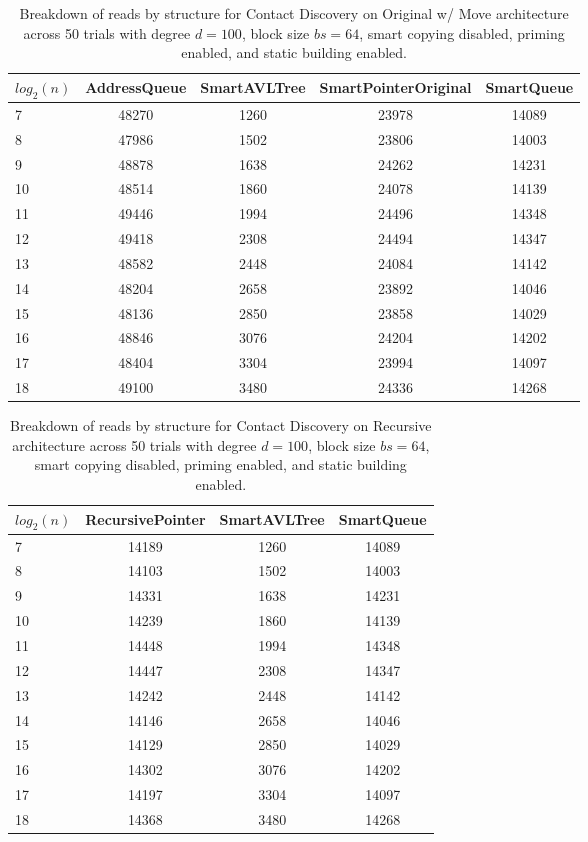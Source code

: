 \begin{table}[]
\centering
\begin{tabular}{|l|c|c|c|c|}
$log_2(n)$ & AddressQueue & SmartAVLTree & SmartPointerOriginal & SmartQueue \\ \hline
7 & 48270 & 1260 & 23978 & 14089 \\ \hline
8 & 47986 & 1502 & 23806 & 14003 \\ \hline
9 & 48878 & 1638 & 24262 & 14231 \\ \hline
10 & 48514 & 1860 & 24078 & 14139 \\ \hline
11 & 49446 & 1994 & 24496 & 14348 \\ \hline
12 & 49418 & 2308 & 24494 & 14347 \\ \hline
13 & 48582 & 2448 & 24084 & 14142 \\ \hline
14 & 48204 & 2658 & 23892 & 14046 \\ \hline
15 & 48136 & 2850 & 23858 & 14029 \\ \hline
16 & 48846 & 3076 & 24204 & 14202 \\ \hline
17 & 48404 & 3304 & 23994 & 14097 \\ \hline
18 & 49100 & 3480 & 24336 & 14268 \\ \hline
\end{tabular}
\caption{Breakdown of reads by structure for Contact Discovery on Original w/ Move architecture across 50 trials with degree $d=100$, block size $bs=64$, smart copying disabled, priming enabled, and static building enabled.}
    \label{tab:reads_by_structure_cd_d100_bs64_trials50_copiesfalse_primetrue_staticinsertiontrue_ptoriginal_movetrue}
\end{table}

\begin{table}[]
\centering
\begin{tabular}{|l|c|c|c|}
$log_2(n)$ & RecursivePointer & SmartAVLTree & SmartQueue \\ \hline
7 & 14189 & 1260 & 14089 \\ \hline
8 & 14103 & 1502 & 14003 \\ \hline
9 & 14331 & 1638 & 14231 \\ \hline
10 & 14239 & 1860 & 14139 \\ \hline
11 & 14448 & 1994 & 14348 \\ \hline
12 & 14447 & 2308 & 14347 \\ \hline
13 & 14242 & 2448 & 14142 \\ \hline
14 & 14146 & 2658 & 14046 \\ \hline
15 & 14129 & 2850 & 14029 \\ \hline
16 & 14302 & 3076 & 14202 \\ \hline
17 & 14197 & 3304 & 14097 \\ \hline
18 & 14368 & 3480 & 14268 \\ \hline
\end{tabular}
\caption{Breakdown of reads by structure for Contact Discovery on Recursive architecture across 50 trials with degree $d=100$, block size $bs=64$, smart copying disabled, priming enabled, and static building enabled.}
    \label{tab:reads_by_structure_cd_d100_bs64_trials50_copiesfalse_primetrue_staticinsertiontrue_ptrecursive_movetrue}
\end{table}

